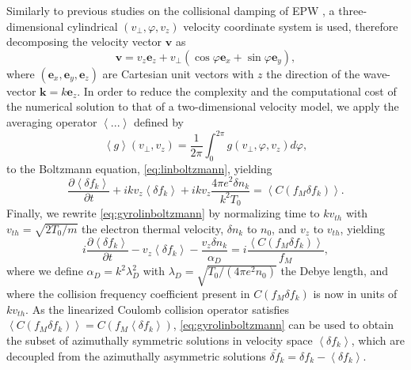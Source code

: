 Similarly to previous studies on the collisional damping of EPW \citep{Brantov2012,Banks2016}, a three-dimensional cylindrical $(v_\perp, \varphi, v_z)$ velocity coordinate system is used, therefore decomposing the velocity vector $\mathbf v$ as
%
\begin{equation}
    \mathbf v = v_z \mathbf e_z + v_\perp(\cos \varphi \mathbf e_x + \sin \varphi \mathbf e_y),
\label{eq:vdecomp}
\end{equation}
%
{where} $(\mathbf e_x, \mathbf e_y, \mathbf e_z)$ {are} {Cartesian} unit vectors with $z$ the direction of the wave-vector $\mathbf k = k \mathbf e_z$.
%
In order to reduce the complexity and the computational cost of the numerical solution to that of a two-dimensional velocity model, we apply the averaging operator $\left<...\right>$ defined by
%
\begin{equation}
    \left< g\right>(v_\perp,v_z) = \frac{1}{2\pi}\int_0^{2\pi} g(v_\perp,\varphi,v_z) d\varphi,
\label{eq:gyrooperator}
\end{equation}
%
to the Boltzmann equation, \cref{eq:linboltzmann}, yielding
%
\begin{equation}
    \frac{\partial \left<\delta f_k\right>}{\partial t} + i k v_z \left<\delta f_k\right> + i k v_z \frac{4 \pi e^2 \delta n_k}{k^2 T_0} = \left<C(f_M \delta f_k)\right>.
\label{eq:gyrolinboltzmann}
\end{equation}
%
Finally, we rewrite \cref{eq:gyrolinboltzmann} by normalizing time to $k v_{th}$ with $v_{th}=\sqrt{2 T_0/m}$ the {electron} thermal velocity, $\delta n_k$ to $n_0$, and $v_z$ to $v_{th}$, yielding
%
\begin{equation}
    i\frac{\partial \left<\delta f_k\right>}{\partial t} - v_z \left<\delta f_k\right>-\frac{ v_z{ \delta n_k}}{\alpha_D} = i\frac{ \left<C(f_M \delta f_k)\right>}{f_M},
\label{eq:boltzmann1eq}
\end{equation}
%
where we define $\alpha_D = k^2 \lambda_D^2$ with $\lambda_D=\sqrt{T_0/(4 \pi e^2 n_0)}$ the Debye length{, and where the collision frequency coefficient present in $C(f_M \delta f_k)$ is now in units of $k v_{th}$}.
%
{As the linearized Coulomb collision operator satisfies $\left<C(f_M \delta f_k)\right>=C(f_M \left<\delta f_k\right>)$, \cref{eq:gyrolinboltzmann} can be used to obtain the subset of azimuthally symmetric solutions in velocity space $\left<\delta f_k \right>$, which are decoupled from the azimuthally asymmetric solutions ${\delta \tilde f}_k = \delta f_k - \left< \delta f_k \right>$.}

